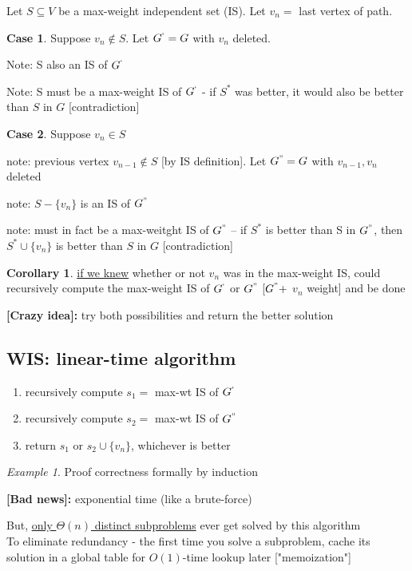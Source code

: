 \documentclass[a4paper,12pt]{article}
\theoremstyle{plain}
\theoremstyle{definition}
\newtheorem*{corollary}{Corollary}
\newtheorem{case}{Case}[subsection]
\theoremstyle{remark}
\newtheorem*{example}{Example}
\begin{document}
Let $S \subseteq V$ be a max-weight independent set (IS). Let $v_n =$ last vertex of path.
\begin{case}
Suppose $v_n \notin S$. Let $G^` = G$ with $v_n$ deleted.

Note: S also an IS of $G^`$

Note: S must be a max-weight IS of $G^`$ - if $S^*$ was better, it would also be better than $S$ in $G$ [contradiction]
\end{case}
\begin{case}
Suppose $v_n \in S$

note: previous vertex $v_{n-1} \notin S$ [by IS definition]. Let $G^" = G$ with $v_{n-1}, v_n$ deleted

note: $S - \{v_n\}$ is an IS of $G^"$

note: must in fact be a max-weitght IS of $G^"$ -- if $S^*$ is better than S in $G^"$, then $S^* \cup \{v_n\}$ is better than $S$ in $G$ [contradiction] 
\end{case}

\begin{corollary}\underline{if we knew} whether or not $v_n$ was in the max-weight IS, could recursively compute the max-weight IS of $G^`$ or $G^"$ [$G^" +$ $v_n$ weight] and be done\end{corollary}
\textbf{[Crazy idea]:} try both possibilities and return the better solution



\subsection{WIS: linear-time algorithm}
\begin{enumerate}
	\item recursively compute $s_1 =$ max-wt IS of $G^`$
	\item recursively compute $s_2 =$ max-wt IS of $G^"$
	\item return $s_1$ or $s_2 \cup \{v_n\}$, whichever is better
\end{enumerate}
\begin{example} Proof correctness formally by induction\end{example}

\textbf{[Bad news]:} exponential time (like a brute-force)\

But, \underline{only $\Theta(n)$ distinct subproblems} ever get solved by this algorithm
\\

To eliminate redundancy - the first time you solve a subproblem, cache its solution in a global table for $O(1)$-time lookup later ["memoization"]
\\
\end{document}
